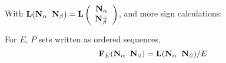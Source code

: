 {%




  With $\mathbf{L}(\mathbf{N}_{\alpha}\;\; \mathbf{N}_\beta)=\mathbf{L}\left(\begin{array}{c}\mathbf{N}_{\alpha} \\ \mathbf{N}_{\beta}^{\perp} \end{array} \right)$, and more sign calculations:
    \begin{definition}
      For $E$, $P$ sets written as ordered sequences,
      \[
      \mathbf{F}_E(\mathbf{N}_{\alpha}\;\;\mathbf{N}_\beta) = \mathbf{L}(\mathbf{N}_{\alpha}\;\;\mathbf{N}_\beta)/E
      \]
    \end{definition}

}



